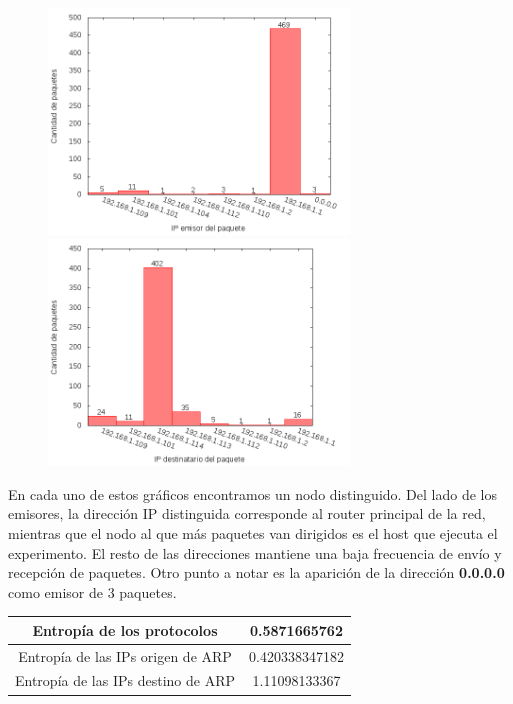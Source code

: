 \begin{figure}[!h]
\centering
\begin{minipage}{8cm}
  \centering
  \includegraphics[width=8cm]{../mediciones/home-wfi-10/home-wfi-10IpsSrcArp.png}
\end{minipage}%
\begin{minipage}{8cm}
  \centering
  \includegraphics[width=8cm]{../mediciones/home-wfi-10/home-wfi-10IpsDstArp.png}
\end{minipage}
\end{figure}

En cada uno de estos gráficos encontramos un nodo distinguido. Del lado de los emisores, la dirección IP distinguida corresponde al
router principal de la red, mientras que el nodo al que más paquetes van dirigidos es el host que ejecuta el experimento. El resto
de las direcciones mantiene una baja frecuencia de envío y recepción de paquetes. Otro punto a notar es la aparición de la dirección
\textbf{0.0.0.0} como emisor de 3 paquetes.

\begin{center}
\begin{tabular}{|c||c|}
\hline
Entropía de los protocolos & 0.5871665762  \\
\hline
Entropía de las IPs origen de ARP & 0.420338347182  \\
\hline
Entropía de las IPs destino de ARP & 1.11098133367 \\
\hline
\end{tabular}
\end{center}


